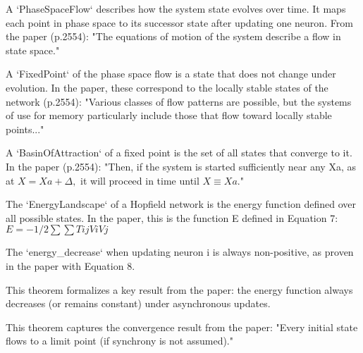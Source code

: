 \begin{definition}\label{PhaseSpaceFlow}
\leanok
A `PhaseSpaceFlow` describes how the system state evolves over time.
It maps each point in phase space to its successor state after updating one neuron.
From the paper (p.2554): "The equations of motion of the system describe a flow in state space."
\end{definition}


\begin{definition}\label{FixedPoint}
\leanok
A `FixedPoint` of the phase space flow is a state that does not change under evolution.
In the paper, these correspond to the locally stable states of the network (p.2554):
"Various classes of flow patterns are possible, but the systems of use for memory
particularly include those that flow toward locally stable points..."
\end{definition}


\begin{definition}\label{BasinOfAttraction}
\leanok
A `BasinOfAttraction` of a fixed point is the set of all states that converge to it.
In the paper (p.2554): "Then, if the system is started sufficiently near any Xa,
as at $X = Xa + \Delta,$ it will proceed in time until $X \equiv Xa.$"
\end{definition}


\begin{definition}\label{EnergyLandscape}
\leanok
The `EnergyLandscape` of a Hopfield network is the energy function defined over all possible states.
In the paper, this is the function E defined in Equation 7:
   $ E = -1/2 \sum \sum Tij Vi Vj$
\end{definition}


\begin{definition}\label{energy_decrease}
\leanok
The `energy_decrease` when updating neuron i is always non-positive,
as proven in the paper with Equation 8.

This theorem formalizes a key result from the paper: the energy function
always decreases (or remains constant) under asynchronous updates.
\end{definition}


\begin{definition}\label{convergence_to_fixed_point}
\leanok
This theorem captures the convergence result from the paper:
"Every initial state flows to a limit point (if synchrony is not assumed)."
\end{definition}

